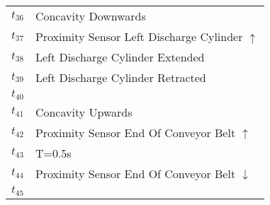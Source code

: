 \begin{table}[H]
\begin{tabular}{M{5cm}M{10cm}}
\hyperlink{partialNet:t361}{\hypertarget{partialTable:t36}{$t_{36}$}} & Concavity Downwards\\
\hyperlink{partialNet:t371}{\hypertarget{partialTable:t37}{$t_{37}$}} & Proximity Sensor Left Discharge Cylinder \(\uparrow\)\\
\hyperlink{partialNet:t381}{\hypertarget{partialTable:t38}{$t_{38}$}} & Left Discharge Cylinder Extended\\
\hyperlink{partialNet:t391}{\hypertarget{partialTable:t39}{$t_{39}$}} & Left Discharge Cylinder Retracted\\
\hyperlink{partialNet:t401}{\hypertarget{partialTable:t40}{$t_{40}$}} & \\
\hyperlink{partialNet:t411}{\hypertarget{partialTable:t41}{$t_{41}$}} & Concavity Upwards\\
\hyperlink{partialNet:t421}{\hypertarget{partialTable:t42}{$t_{42}$}} & Proximity Sensor End Of Conveyor Belt \(\uparrow\)\\
\hyperlink{partialNet:tt431}{\hypertarget{partialTable:tt43}{$t_{43}$}} & T=0.5s\\
\hyperlink{partialNet:t441}{\hypertarget{partialTable:t44}{$t_{44}$}} & Proximity Sensor End Of Conveyor Belt \(\downarrow\)\\
\hyperlink{partialNet:t451}{\hypertarget{partialTable:t45}{$t_{45}$}} & \\
\end{tabular}
\end{table}
